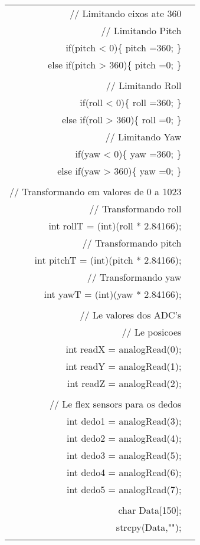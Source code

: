 \begin{longtable}{Rp{15cm}}
\\
\qquad  // Limitando eixos ate 360 \\
\qquad  // Limitando Pitch \\
\qquad  if(pitch < 0)\{ pitch =360; \} \\
\qquad  else if(pitch > 360)\{ pitch =0; \} \\
\\
\qquad  // Limitando Roll \\
\qquad  if(roll < 0)\{ roll =360; \} \\
\qquad  else if(roll > 360)\{ roll =0; \}  \\
\qquad  // Limitando Yaw \\
\qquad  if(yaw < 0)\{ yaw =360; \} \\
\qquad  else if(yaw > 360)\{ yaw =0; \}  \\
\\
\qquad  // Transformando em valores de 0 a 1023 \\
\qquad  // Transformando roll \\
\qquad  int rollT = (int)(roll * 2.84166); \\
\qquad  // Transformando pitch \\
\qquad  int pitchT = (int)(pitch * 2.84166); \\
\qquad  // Transformando yaw \\
\qquad  int yawT = (int)(yaw * 2.84166); \\ 
  \\
\qquad  // Le valores dos ADC's \\
\qquad  // Le posicoes \\
\qquad  int readX = analogRead(0); \\
\qquad  int readY = analogRead(1); \\
\qquad  int readZ = analogRead(2);  \\
\\
\qquad  // Le flex sensors para os dedos \\
\qquad  int dedo1 = analogRead(3); \\
\qquad  int dedo2 = analogRead(4); \\
\qquad  int dedo3 = analogRead(5); \\
\qquad  int dedo4 = analogRead(6); \\
\qquad  int dedo5 = analogRead(7); \\
\\
\qquad  char Data[150]; \\
\qquad  strcpy(Data,""); \\
\\

\end{longtable}
